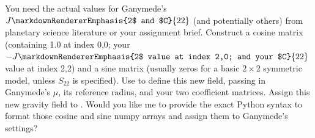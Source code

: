 {}\markdownRendererOlBegin
{} You need the actual values for Ganymede's $J\markdownRendererEmphasis{2$ and $C}{22}$ (and potentially others) from planetary science literature or your assignment brief.\markdownRendererOlItemEnd 
{} Construct a cosine matrix (containing 1.0 at index 0,0; your $-J\markdownRendererEmphasis{2$ value at index 2,0; and your $C}{22}$ value at index 2,2) and a sine matrix (usually zeros for a basic $2\times2$ symmetric model, unless $S_{22}$ is specified).\markdownRendererOlItemEnd 
{} Use  to define this new field, passing in Ganymede's $\mu$, its reference radius, and your two coefficient matrices.\markdownRendererOlItemEnd 
{} Assign this new gravity field to .\markdownRendererOlItemEnd 
\markdownRendererOlEnd \markdownRendererInterblockSeparator
{}\markdownRendererInterblockSeparator
{}Would you like me to provide the exact Python syntax to format those cosine and sine numpy arrays and assign them to Ganymede's settings?\markdownRendererInterblockSeparator
{}\markdownRendererThematicBreak{}\markdownRendererInterblockSeparator
{}
\markdownRendererSectionEnd 
\markdownRendererSectionEnd \markdownRendererSectionBegin
{}\markdownRendererInterblockSeparator
